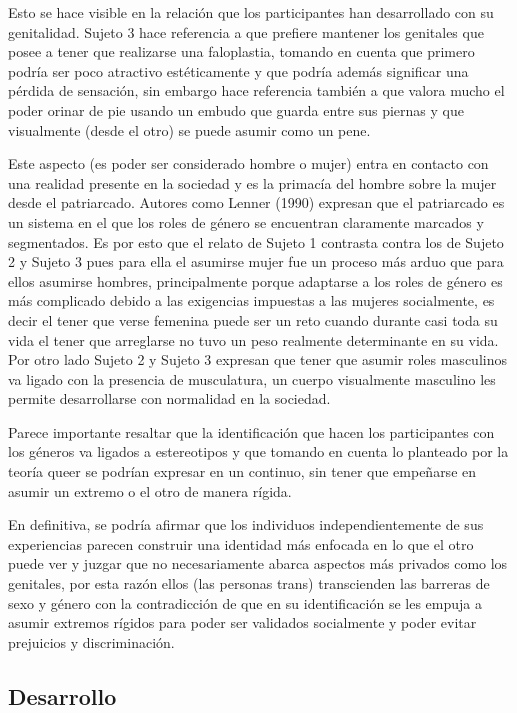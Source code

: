 Esto se hace visible en la relación que los participantes han desarrollado con
su genitalidad. Sujeto 3 hace referencia a que prefiere mantener los genitales
que posee a tener que realizarse una faloplastia, tomando en cuenta que primero
podría ser poco atractivo estéticamente y que podría además significar una
pérdida de sensación, sin embargo hace referencia también a que valora mucho el
poder orinar de pie usando un embudo que guarda entre sus piernas y que
visualmente (desde el otro) se puede asumir como un pene.

Este aspecto (es poder ser considerado hombre o mujer) entra en contacto con una
realidad presente en la sociedad y es la primacía del hombre sobre la mujer
desde el patriarcado. Autores como Lenner (1990) expresan que el patriarcado es
un sistema en el que los roles de género se encuentran claramente marcados y
segmentados. Es por esto que el relato de Sujeto 1 contrasta contra los de
Sujeto 2 y Sujeto 3 pues para ella el asumirse mujer fue un proceso más arduo
que para ellos asumirse hombres, principalmente porque adaptarse a los roles de
género es más complicado debido a las exigencias impuestas a las mujeres
socialmente, es decir el tener que verse femenina puede ser un reto cuando
durante casi toda su vida el tener que arreglarse no tuvo un peso realmente
determinante en su vida. Por otro lado Sujeto 2 y Sujeto 3 expresan que tener
que asumir roles masculinos va ligado con la presencia de musculatura, un cuerpo
visualmente masculino les permite desarrollarse con normalidad en la sociedad.

Parece importante resaltar que la identificación que hacen los participantes con
los géneros va ligados a estereotipos y que tomando en cuenta lo planteado por
la teoría queer se podrían expresar en un continuo, sin tener que empeñarse en
asumir un extremo o el otro de manera rígida.

En definitiva, se podría afirmar que los individuos independientemente de sus
experiencias parecen construir una identidad más enfocada en lo que el otro
puede ver y juzgar que no necesariamente abarca aspectos más privados como los
genitales,  por esta razón ellos (las personas trans) transcienden las barreras
de sexo y género con la contradicción de que en su identificación se les empuja
a asumir extremos rígidos para poder ser validados socialmente y poder evitar
prejuicios y discriminación.

\subsection{Desarrollo}
%
%
%
